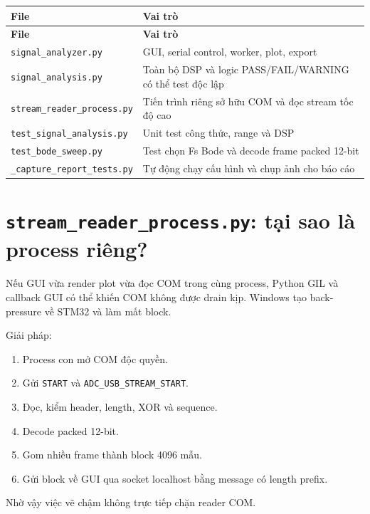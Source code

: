 \documentclass[12pt,a4paper,oneside]{article}
\newcommand{\inlinecode}[1]{\texttt{#1}}
\begin{document}
\begin{longtable}{|>{\raggedright\arraybackslash}p{}|>{\raggedright\arraybackslash}p{}|}
\hline
\textbf{File} & \textbf{Vai trò} \\ \hline
\endfirsthead
\hline
\textbf{File} & \textbf{Vai trò} \\ \hline
\endhead
\inlinecode{signal\_analyzer.py} & GUI, serial control, worker, plot, export \\ \hline
\inlinecode{signal\_analysis.py} & Toàn bộ DSP và logic PASS/FAIL/WARNING có thể test độc lập \\ \hline
\inlinecode{stream\_reader\_process.py} & Tiến trình riêng sở hữu COM và đọc stream tốc độ cao \\ \hline
\inlinecode{test\_signal\_analysis.py} & Unit test công thức, range và DSP \\ \hline
\inlinecode{test\_bode\_sweep.py} & Test chọn Fs Bode và decode frame packed 12-bit \\ \hline
\inlinecode{\_capture\_report\_tests.py} & Tự động chạy cấu hình và chụp ảnh cho báo cáo \\ \hline
\end{longtable}

\section{\inlinecode{stream\_reader\_process.py}: tại sao là process riêng?}

Nếu GUI vừa render plot vừa đọc COM trong cùng process, Python GIL và callback GUI có thể khiến COM không được drain kịp. Windows tạo back-pressure về STM32 và làm mất block.

Giải pháp:

\begin{enumerate}
\item Process con mở COM độc quyền.
\item Gửi \inlinecode{START} và \inlinecode{ADC\_USB\_STREAM\_START}.
\item Đọc, kiểm header, length, XOR và sequence.
\item Decode packed 12-bit.
\item Gom nhiều frame thành block 4096 mẫu.
\item Gửi block về GUI qua socket localhost bằng message có length prefix.
\end{enumerate}

Nhờ vậy việc vẽ chậm không trực tiếp chặn reader COM.
\end{document}
